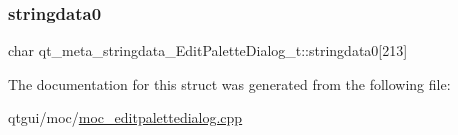 \subsubsection{\texorpdfstring{stringdata0}{stringdata0}}
{\footnotesize\ttfamily char qt\+\_\+meta\+\_\+stringdata\+\_\+\+Edit\+Palette\+Dialog\+\_\+t\+::stringdata0\mbox{[}213\mbox{]}}



The documentation for this struct was generated from the following file\+:\begin{DoxyCompactItemize}
\item 
qtgui/moc/\mbox{\hyperlink{moc__editpalettedialog_8cpp}{moc\+\_\+editpalettedialog.\+cpp}}\end{DoxyCompactItemize}
